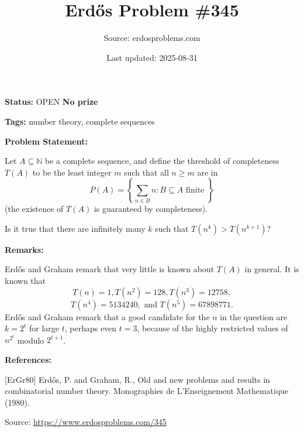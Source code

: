 \documentclass{article}
\title{Erd\H{o}s Problem \#345}
\date{Last updated: 2025-08-31}
\author{Source: erdosproblems.com}
\begin{document}
\maketitle

\noindent\textbf{Status:} OPEN \quad \textbf{No prize}

\noindent\textbf{Tags:} number theory, complete sequences

\medskip
\noindent\textbf{Problem Statement:}

Let $A\subseteq \mathbb{N}$ be a complete sequence, and define the threshold of completeness $T(A)$ to be the least integer $m$ such that all $n\geq m$ are in\[P(A) = \left\{\sum_{n\in B}n : B\subseteq A\textrm{ finite }\right\}\](the existence of $T(A)$ is guaranteed by completeness). 

Is it true that there are infinitely many $k$ such that $T(n^k)>T(n^{k+1})$?

\bigskip
\noindent\textbf{Remarks:}

Erd\H{o}s and Graham \cite{ErGr80} remark that very little is known about $T(A)$ in general. It is known that\[T(n)=1, T(n^2)=128, T(n^3)=12758,\]\[T(n^4)=5134240,\textrm{ and }T(n^5)=67898771.\]Erd\H{o}s and Graham remark that a good candidate for the $n$ in the question are $k=2^t$ for large $t$, perhaps even $t=3$, because of the highly restricted values of $n^{2^t}$ modulo $2^{t+1}$.

\bigskip
\noindent\textbf{References:}

[ErGr80] Erd\H{o}s, P. and Graham, R., Old and new problems and results in combinatorial number theory. Monographies de L'Enseignement Mathematique (1980).

\bigskip
\noindent\small{Source: \url{https://www.erdosproblems.com/345}}
\end{document}

